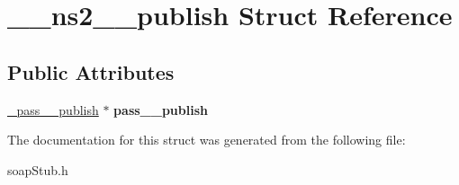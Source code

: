 \hypertarget{struct____ns2____publish}{
\section{\_\-\_\-ns2\_\-\_\-publish Struct Reference}
\label{struct____ns2____publish}
}
\subsection*{Public Attributes}
\begin{DoxyCompactItemize}
\item 
\hypertarget{struct____ns2____publish_a555d60852b92c084155f0156edc2297d}{
\hyperlink{class__pass____publish}{\_\-pass\_\-\_\-publish} $\ast$ {\bfseries pass\_\-\_\-publish}}
\label{struct____ns2____publish_a555d60852b92c084155f0156edc2297d}

\end{DoxyCompactItemize}


The documentation for this struct was generated from the following file:\begin{DoxyCompactItemize}
\item 
soapStub.h\end{DoxyCompactItemize}
